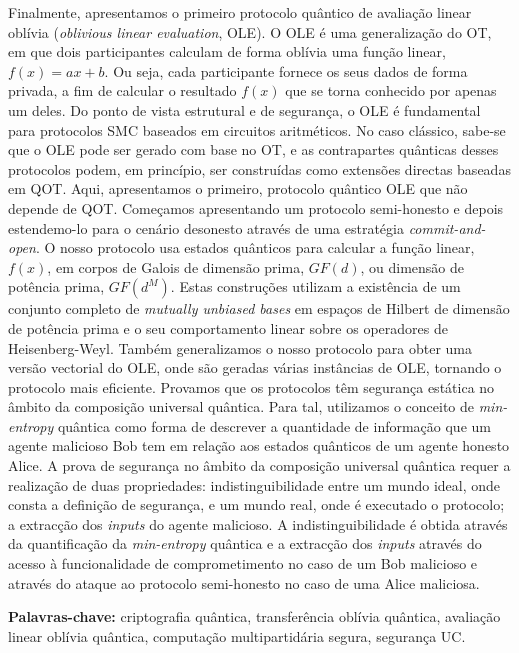 \documentclass[11pt]{report}
\begin{document}
Finalmente, apresentamos o primeiro protocolo quântico de  avaliação linear oblívia (\textit{oblivious linear evaluation}, OLE). O OLE é uma generalização do OT, em que dois participantes calculam de forma oblívia uma função linear, $f(x) = ax + b$. Ou seja, cada participante fornece os seus dados de forma privada, a fim de calcular o resultado $f(x)$ que se torna conhecido por apenas um deles. Do ponto de vista estrutural e de segurança, o OLE é fundamental para protocolos SMC baseados em circuitos aritméticos. No caso clássico, sabe-se que o OLE pode ser gerado com base no OT, e as contrapartes quânticas desses protocolos podem, em princípio, ser construídas como extensões directas baseadas em QOT. Aqui, apresentamos o primeiro, protocolo quântico OLE que não depende de QOT. Começamos apresentando um protocolo semi-honesto e depois estendemo-lo para o cenário desonesto através de uma estratégia \textit{commit-and-open}. O nosso protocolo usa estados quânticos para calcular a função linear, $f(x)$, em corpos de Galois de dimensão prima, $GF(d)$, ou dimensão de potência prima, $GF(d^M)$. Estas construções utilizam a existência de um conjunto completo de \textit{mutually unbiased bases} em espaços de Hilbert de dimensão de potência prima e o seu comportamento linear sobre os operadores de Heisenberg-Weyl. Também generalizamos o nosso protocolo para obter uma versão vectorial do OLE, onde são geradas várias instâncias de OLE, tornando o protocolo mais eficiente. Provamos que os protocolos têm segurança estática no âmbito da composição universal quântica. Para tal, utilizamos o conceito de \textit{min-entropy} quântica como forma de descrever a quantidade de informação que um agente malicioso Bob tem em relação aos estados quânticos de um agente honesto Alice. A prova de segurança no âmbito da composição universal quântica requer a realização de duas propriedades: indistinguibilidade entre um mundo ideal, onde consta a definição de segurança, e um mundo real, onde é executado o protocolo; a extracção dos \textit{inputs} do agente malicioso. A indistinguibilidade é obtida através da quantificação da \textit{min-entropy} quântica e a extracção dos \textit{inputs} através do acesso à funcionalidade de comprometimento no caso de um Bob malicioso e através do ataque ao protocolo semi-honesto no caso de uma Alice maliciosa.


\vfill
\begin{flushleft}
\textbf{Palavras-chave:} criptografia qu\^{a}ntica, transferência oblívia quântica, avaliação linear oblívia quântica, computação multipartidária segura, segurança UC.
\end{flushleft}
\end{document}
